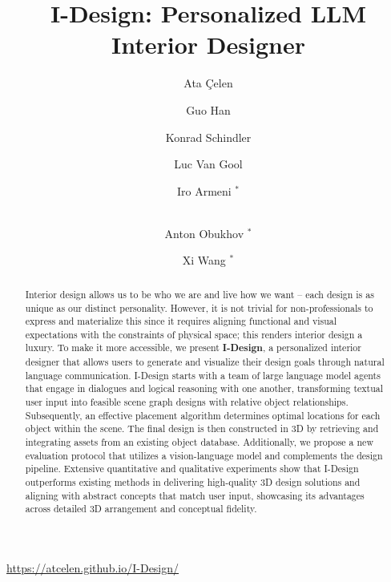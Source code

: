 \documentclass[runningheads]{llncs}
\newcommand{\methodname}{I-Design\xspace}
\begin{document}
\title{I-Design: Personalized LLM Interior Designer}


\author{Ata Çelen \and
Guo Han \and
Konrad Schindler  \and
Luc Van Gool  \and
Iro Armeni $^*$ \and
\\
Anton Obukhov $^*$ \and
Xi Wang $^*$
}


\maketitle

\begin{center}
    \url{https://atcelen.github.io/I-Design/}
\end{center}


\begin{abstract}
Interior design allows us to be who we are and live how we want -- each design is as unique as our distinct personality.
However, it is not trivial for non-professionals to express and materialize this since it requires aligning functional and visual expectations with the constraints of physical space; this renders interior design a luxury.
To make it more accessible, we present \textbf{\methodname}, a personalized interior designer that allows users to generate and visualize their design goals through natural language communication. 
\methodname starts with a team of large language model agents that engage in dialogues and logical reasoning with one another, transforming textual user input into feasible scene graph designs with relative object relationships.  
Subsequently, an effective placement algorithm determines optimal locations for each object within the scene. 
The final design is then constructed in 3D by retrieving and integrating assets from an existing object database. 
Additionally, we propose a new evaluation protocol that utilizes a vision-language model and complements the design pipeline. 
Extensive quantitative and qualitative experiments show that \methodname outperforms existing methods in delivering high-quality 3D design solutions and aligning with abstract concepts that match user input, showcasing its advantages across detailed 3D arrangement and conceptual fidelity.
\end{abstract}
\end{document}
